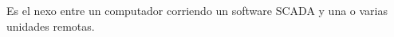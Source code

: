  Es el nexo entre un computador corriendo un software SCADA y una o varias unidades remotas.
 
%
% 
% 
% 
% 
% 
